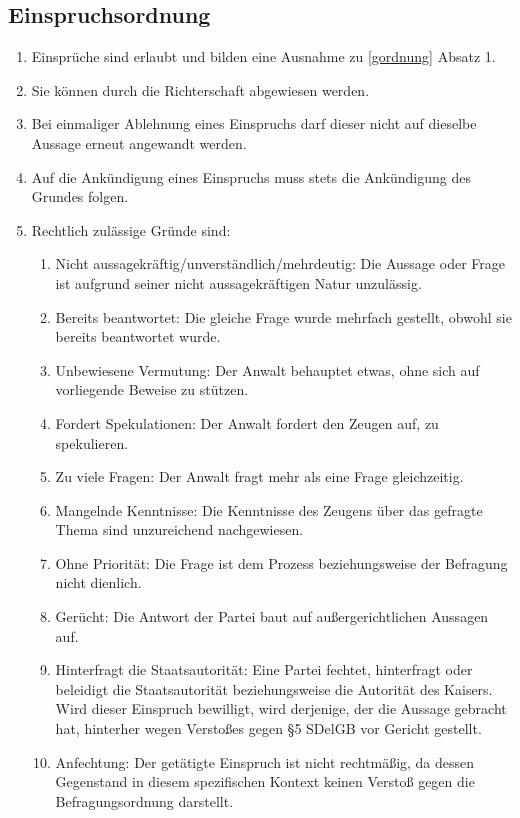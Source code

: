\documentclass{article}
\begin{document}
\subsection{Einspruchsordnung}\label{eordnung}
\begin{enumerate}[(1)]
    \item Einsprüche sind erlaubt und bilden eine Ausnahme zu \ref{gordnung} Absatz 1.
    \item Sie können durch die Richterschaft abgewiesen werden.
    \item Bei einmaliger Ablehnung eines Einspruchs darf dieser nicht auf dieselbe Aussage erneut angewandt werden.
    \item Auf die Ankündigung eines Einspruchs muss stets die Ankündigung des Grundes folgen.
    \item Rechtlich zulässige Gründe sind:
        \begin{enumerate}[1.]
            \item Nicht aussagekräftig/unverständlich/mehrdeutig: Die Aussage oder Frage ist aufgrund seiner nicht aussagekräftigen Natur unzulässig.
            \item Bereits beantwortet: Die gleiche Frage wurde mehrfach gestellt, obwohl sie bereits beantwortet wurde.
            \item Unbewiesene Vermutung: Der Anwalt behauptet etwas, ohne sich auf vorliegende Beweise zu stützen.
            \item Fordert Spekulationen: Der Anwalt fordert den Zeugen auf, zu spekulieren.
            \item Zu viele Fragen: Der Anwalt fragt mehr als eine Frage gleichzeitig.
            \item Mangelnde Kenntnisse: Die Kenntnisse des Zeugens über das gefragte Thema sind unzureichend nachgewiesen.
            \item Ohne Priorität: Die Frage ist dem Prozess beziehungsweise der Befragung nicht dienlich.
            \item Gerücht: Die Antwort der Partei baut auf außergerichtlichen Aussagen auf.
            \item Hinterfragt die Staatsautorität: Eine Partei fechtet, hinterfragt oder beleidigt die Staatsautorität beziehungsweise die Autorität des Kaisers. Wird dieser Einspruch bewilligt, wird derjenige, der die Aussage gebracht hat, hinterher wegen Verstoßes gegen §5 SDelGB vor Gericht gestellt.
            \item Anfechtung: Der getätigte Einspruch ist nicht rechtmäßig, da dessen Gegenstand in diesem spezifischen Kontext keinen Verstoß gegen die Befragungsordnung darstellt.

\end{enumerate}
\end{enumerate}
\end{document}
